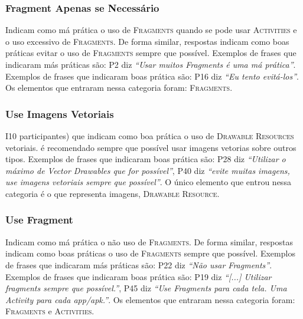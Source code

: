 \subsubsection{Fragment Apenas se Necessário}
Indicam como má prática o uso de \textsc{Fragments} quando se pode usar \textsc{Activities} e o uso excessivo de \textsc{Fragments}. De forma similar, respostas indicam como boas práticas evitar o uso de \textsc{Fragments} sempre que possível. Exemplos de frases que indicaram más práticas são: P2 diz \textit{``Usar muitos Fragments é uma má prática''}. Exemplos de frases que indicaram boas prática são: P16 diz \textit{``Eu tento evitá-los''}. Os elementos que entraram nessa categoria foram: \textsc{Fragments}. 

\subsubsection{Use Imagens Vetoriais}
I10 participantes) que indicam como boa prática o uso de \textsc{Drawable Resources} vetoriais. é recomendado sempre que possível usar imagens vetorias sobre outros tipos. Exemplos de frases que indicaram boas prática são: P28 diz \textit{``Utilizar o máximo de Vector Drawables que for possível''}, P40 diz \textit{``evite muitas imagens, use imagens vetoriais sempre que possível''}. O único elemento que entrou nessa categoria é o que representa imagens, \textsc{Drawable Resource}.

\subsubsection{Use Fragment}
Indicam como má prática o não uso de \textsc{Fragments}. De forma similar, respostas indicam como boas práticas o uso de \textsc{Fragments} sempre que possível. Exemplos de frases que indicaram más práticas são: P22 diz \textit{``Não usar Fragments''}. Exemplos de frases que indicaram boas prática são: P19 diz \textit{``[...] Utilizar fragments sempre que possível.''}, P45 diz \textit{``Use Fragments para cada tela. Uma Activity para cada app/apk.''}. Os elementos que entraram nessa categoria foram: \textsc{Fragments} e \textsc{Activities}. 

